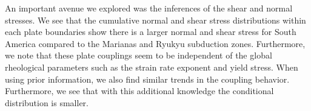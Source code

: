 \documentclass[12pt]{article}
\begin{document}
An important avenue we explored was the inferences of the shear and normal stresses. We see that the cumulative normal and shear stress distributions within each plate boundaries show there is a larger normal and shear stress for South America compared to the Marianas and Ryukyu subduction zones. Furthermore, we note that these plate couplings seem to be independent of the global rheological parameters such as the strain rate exponent and yield stress. When using prior information, we also find similar trends in the coupling behavior. Furthermore, we see that with this additional knowledge the conditional distribution is smaller.



\end{document}
